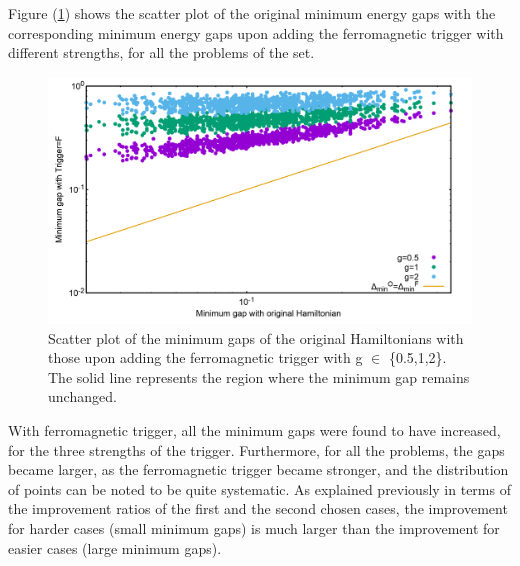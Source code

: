 \documentclass[12]{article}
\begin{document}
Figure (\ref{fig:f10}) shows the scatter plot of the original minimum energy gaps with the corresponding minimum energy gaps upon adding the ferromagnetic trigger with different strengths, for all the problems of the set.

\begin{figure}[H]
\centering 
\includegraphics[scale=0.25]{Mingap_F_g0_1_2.png}
\caption{Scatter plot of the minimum gaps of the original Hamiltonians with those upon adding the ferromagnetic trigger with g $\in$ \{0.5,1,2\}. The solid line represents the region where the minimum gap remains unchanged.}
\label{fig:f10}
\end{figure}
With ferromagnetic trigger, all the minimum gaps were found to have increased, for  the three strengths of the trigger. Furthermore, for all the problems, the gaps became larger, as the ferromagnetic trigger became stronger, and the distribution of points can be noted to be quite systematic. As explained previously in terms of the improvement ratios of the first and the second chosen cases, the improvement for harder cases (small minimum gaps) is much larger than the improvement for easier cases (large minimum gaps).
\end{document}
